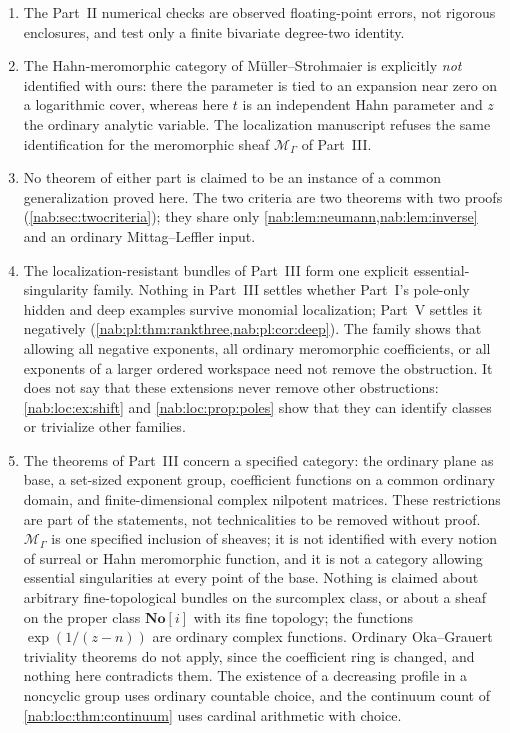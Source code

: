 \documentclass[11pt,letterpaper]{article}
\theoremstyle{definition}
\theoremstyle{remark}
\newcommand{\No}{\mathbf{No}}
\newcommand{\MM}{\mathscr M_\Gamma}
\numberwithin{equation}{section}
\begin{document}
\begin{enumerate}
\item\label{nab:nc:numerics}
The Part~II numerical checks are observed floating-point errors, not rigorous
enclosures, and test only a finite bivariate degree-two identity.

\item\label{nab:nc:mueller}
The Hahn-meromorphic category of M\"uller--Strohmaier \cite{Muller} is
explicitly \emph{not} identified with ours: there the parameter is tied to an
expansion near zero on a logarithmic cover, whereas here $t$ is an independent
Hahn parameter and $z$ the ordinary analytic variable. The localization
manuscript refuses the same identification for the meromorphic sheaf $\MM$ of
Part~III.

\item\label{nab:nc:common}
No theorem of either part is claimed to be an instance of a common
generalization proved here. The two criteria are two theorems with two proofs
(\cref{nab:sec:twocriteria}); they share only
\cref{nab:lem:neumann,nab:lem:inverse} and an ordinary Mittag--Leffler input.

\item\label{nab:loc:nc:family}
The localization-resistant bundles of Part~III form one explicit
essential-singularity family. Nothing in Part~III settles whether Part~I's
pole-only hidden and deep examples survive monomial localization; Part~V settles
it negatively (\cref{nab:pl:thm:rankthree,nab:pl:cor:deep}). The family shows that allowing all negative
exponents, all ordinary meromorphic coefficients, or all exponents of a larger
ordered workspace need not remove the obstruction. It does not say that these
extensions never remove other obstructions: \cref{nab:loc:ex:shift} and
\cref{nab:loc:prop:poles} show that they can identify classes or trivialize
other families.

\item\label{nab:loc:nc:category}
The theorems of Part~III concern a specified category: the ordinary plane as
base, a set-sized exponent group, coefficient functions on a common ordinary
domain, and finite-dimensional complex nilpotent matrices. These restrictions
are part of the statements, not technicalities to be removed without proof.
$\MM$ is one specified inclusion of sheaves; it is not identified with every
notion of surreal or Hahn meromorphic function, and it is not a category
allowing essential singularities at every point of the base. Nothing is
claimed about arbitrary fine-topological bundles on the surcomplex class, or
about a sheaf on the proper class $\No[i]$ with its fine topology; the
functions $\exp(1/(z-n))$ are ordinary complex functions. Ordinary
Oka--Grauert triviality theorems do not apply, since the coefficient ring is
changed, and nothing here contradicts them. The existence of a decreasing
profile in a noncyclic group uses ordinary countable choice, and the continuum
count of \cref{nab:loc:thm:continuum} uses cardinal arithmetic with choice.


\end{enumerate}
\end{document}
